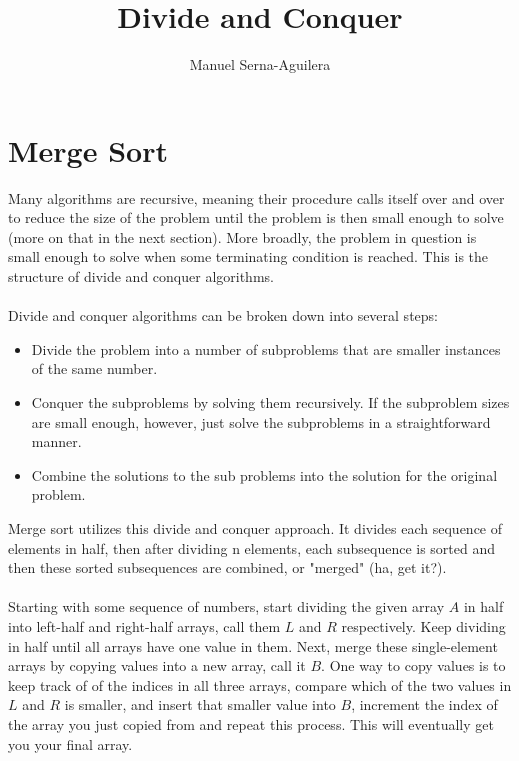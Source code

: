 \documentclass{article}
\title{Divide and Conquer}
\author{Manuel Serna-Aguilera}
\date{}
\begin{document}
\maketitle

\section*{Merge Sort}
Many algorithms are recursive, meaning their procedure calls itself over and over to reduce the size of the problem until the problem is then small enough to solve (more on that in the next section). More broadly, the problem in question is small enough to solve when some terminating condition is reached. This is the structure of divide and conquer algorithms.
\\
\\
Divide and conquer algorithms can be broken down into several steps:
\begin{itemize}
  \item Divide the problem into a number of subproblems that are smaller instances of the same number.
  \item Conquer the subproblems by solving them recursively. If the subproblem sizes are small enough, however, just solve the subproblems in a straightforward manner.
  \item Combine the solutions to the sub problems into the solution for the original problem.
\end{itemize}
Merge sort utilizes this divide and conquer approach. It divides each sequence of elements in half, then after dividing n elements, each subsequence is sorted and then these sorted subsequences are combined, or "merged" (ha, get it?).
\\
\\
Starting with some sequence of numbers, start dividing the given array $A$ in half into left-half and right-half arrays, call them $L$ and $R$ respectively. Keep dividing in half until all arrays have one value in them. Next, merge these single-element arrays by copying values into a new array, call it $B$. One way to copy values is to keep track of of the indices in all three arrays, compare which of the two values in $L$ and $R$ is smaller, and insert that smaller value into $B$, increment the index of the array you just copied from and repeat this process. This will eventually get you your final array.

\newpage
\end{document}
